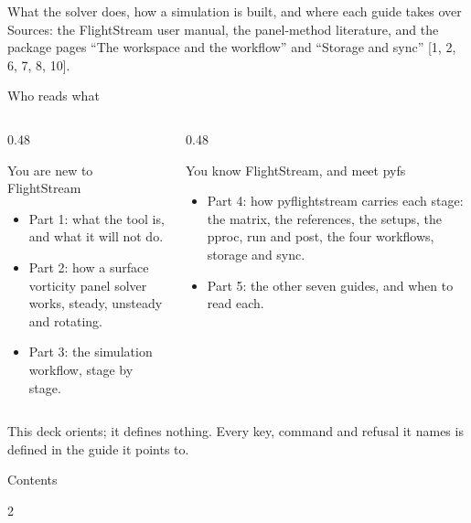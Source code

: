 \documentclass[aspectratio=169,11pt]{beamer}
\begin{document}
  {What the solver does, how a simulation is built, and where each guide
   takes over}
  {Sources: the FlightStream user manual, the panel-method literature, and
   the package pages ``The workspace and the workflow'' and ``Storage and
   sync'' [1, 2, 6, 7, 8, 10].}

\begin{frame}{Who reads what}
\begin{columns}[T]
\begin{column}{0.48\textwidth}
\begin{block}{You are new to FlightStream}
\begin{itemize}\small
  \item Part 1: what the tool is, and what it will not do.
  \item Part 2: how a surface vorticity panel solver works, steady,
        unsteady and rotating.
  \item Part 3: the simulation workflow, stage by stage.
\end{itemize}
\end{block}
\end{column}
\begin{column}{0.48\textwidth}
\begin{block}{You know FlightStream, and meet pyfs}
\begin{itemize}\small
  \item Part 4: how pyflightstream carries each stage: the matrix, the
        references, the setups, the pproc, run and post, the four
        workflows, storage and sync.
  \item Part 5: the other seven guides, and when to read each.
\end{itemize}
\end{block}
\end{column}
\end{columns}
\vspace{2mm}
\begin{takeaway}This deck orients; it defines nothing. Every key, command and
refusal it names is defined in the guide it points to.\end{takeaway}
\end{frame}

\begin{frame}{Contents}
\begin{multicols}{2}
\tableofcontents
\end{multicols}
\end{frame}
\end{document}
